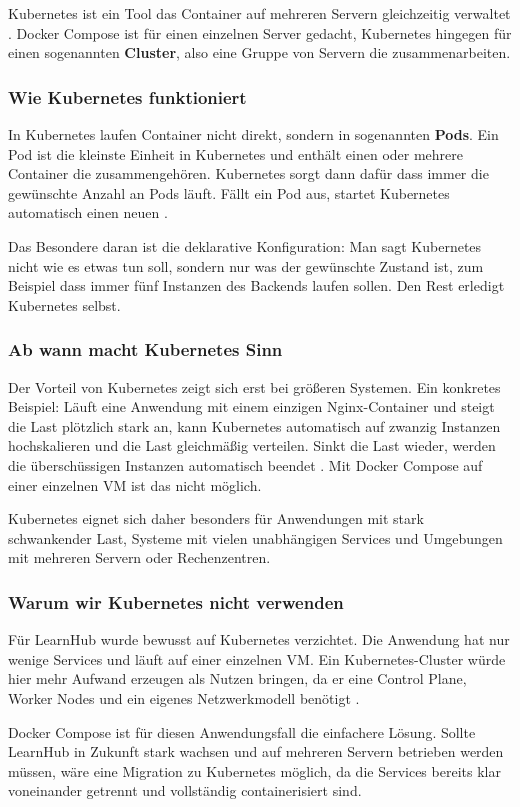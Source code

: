Kubernetes ist ein Tool das Container auf mehreren Servern 
gleichzeitig verwaltet \cite{kubernetes_docs}. Docker Compose 
ist für einen einzelnen Server gedacht, Kubernetes hingegen 
für einen sogenannten \textbf{Cluster}, also eine Gruppe von 
Servern die zusammenarbeiten.

\subsubsection{Wie Kubernetes funktioniert}

In Kubernetes laufen Container nicht direkt, sondern in 
sogenannten \textbf{Pods}. Ein Pod ist die kleinste Einheit 
in Kubernetes und enthält einen oder mehrere Container die 
zusammengehören. Kubernetes sorgt dann dafür dass immer die 
gewünschte Anzahl an Pods läuft. Fällt ein Pod aus, startet 
Kubernetes automatisch einen neuen \cite{kubernetes_docs}.

Das Besondere daran ist die deklarative Konfiguration: Man 
sagt Kubernetes nicht wie es etwas tun soll, sondern nur 
was der gewünschte Zustand ist, zum Beispiel dass immer fünf 
Instanzen des Backends laufen sollen. Den Rest erledigt 
Kubernetes selbst.

\subsubsection{Ab wann macht Kubernetes Sinn}

Der Vorteil von Kubernetes zeigt sich erst bei größeren 
Systemen. Ein konkretes Beispiel: Läuft eine Anwendung mit 
einem einzigen Nginx-Container und steigt die Last plötzlich 
stark an, kann Kubernetes automatisch auf zwanzig Instanzen 
hochskalieren und die Last gleichmäßig verteilen. Sinkt die 
Last wieder, werden die überschüssigen Instanzen automatisch 
beendet \cite{kubernetes_docs}. Mit Docker Compose auf einer 
einzelnen VM ist das nicht möglich.

Kubernetes eignet sich daher besonders für Anwendungen mit 
stark schwankender Last, Systeme mit vielen unabhängigen 
Services und Umgebungen mit mehreren Servern oder 
Rechenzentren.

\subsubsection{Warum wir Kubernetes nicht verwenden}

Für LearnHub wurde bewusst auf Kubernetes verzichtet. Die 
Anwendung hat nur wenige Services und läuft auf einer 
einzelnen VM. Ein Kubernetes-Cluster würde hier mehr Aufwand 
erzeugen als Nutzen bringen, da er eine Control Plane, 
Worker Nodes und ein eigenes Netzwerkmodell benötigt 
\cite{kubernetes_docs}.

Docker Compose ist für diesen Anwendungsfall die einfachere 
Lösung. Sollte LearnHub in Zukunft stark wachsen und auf 
mehreren Servern betrieben werden müssen, wäre eine Migration 
zu Kubernetes möglich, da die Services bereits klar 
voneinander getrennt und vollständig containerisiert sind.